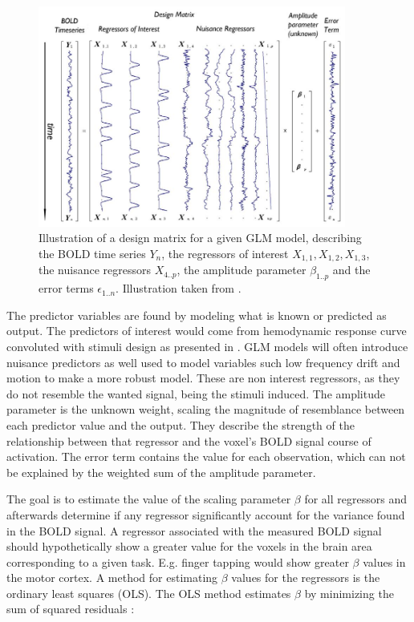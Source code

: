 \begin{figure}[H] 
	\includegraphics[width=0.90\textwidth]{figures/aBackground/GLM}
	\caption{Illustration of a design matrix for a given GLM model, describing the BOLD time series $Y_n$, the regressors of interest $X_{1,1}, X_{1,2}, X_{1,3}$, the nuisance regressors $X_{4..p}$, the amplitude parameter $\beta_{1..p}$ and the error terms $\epsilon_{1..n}$. Illustration taken from \cite{Monti2011}.}
	\label{fig:GLM}
\end{figure}



The predictor variables are found by modeling what is known or predicted as output. The predictors of interest would come from hemodynamic response curve convoluted with stimuli design as presented in . GLM models will often introduce nuisance predictors as well used to model variables such low frequency drift and motion to make a more robust model. These are non interest regressors, as they do not resemble the wanted signal, being the stimuli induced. The amplitude parameter is the unknown weight, scaling the magnitude of resemblance between each predictor value and the output. They describe the strength of the relationship between that regressor and the voxel's BOLD signal course of activation. The error term contains the value for each observation, which can not be explained by the weighted sum of the amplitude parameter. \cite{Moayedi2018,Monti2011} 

The goal is to estimate the value of the scaling parameter $\beta$ for all regressors and afterwards determine if any regressor significantly account for the variance found in the BOLD signal. A regressor associated with the measured BOLD signal should hypothetically show a greater value for the voxels in the brain area corresponding to a given task. E.g. finger tapping would show greater $\beta$ values in the motor cortex. A method for estimating $\beta$ values for the regressors is the ordinary least squares (OLS). The OLS method estimates $\beta$ by minimizing the sum of squared residuals \cite{Monti2011}: 

